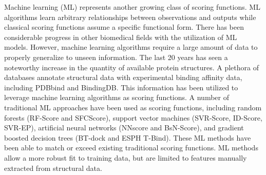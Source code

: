 \documentclass[linenumbers,doublespacing]{bmcart}
\begin{document}
Machine learning (ML) represents another growing class of scoring functions\cite{liu2015classification}. ML algorithms learn arbitrary relationships between observations and outputs while classical scoring functions assume a specific functional form\cite{ain2015machine}. There has been considerable progress in other biomedical fields with the utilization of ML models\cite{zitnik2019machine}. However, machine learning algorithms require a large amount of data to properly generalize to unseen information. The last 20 years has seen a noteworthy increase in the quantity of available protein structures\cite{berman2000protein}. A plethora of databases annotate structural data with experimental binding affinity data, including PDBbind and BindingDB\cite{wang2004pdbbind,liu2017forging,gilson2016bindingdb}. This information has been utilized to leverage machine learning algorithms as scoring functions. A number of traditional ML approaches have been used as scoring functions, including random forests (RF-Score\cite{ballester2010machine} and SFCScore\cite{zilian2013sfcscore}), support vector machines (SVR-Score\cite{ballester2012machine}, ID-Score\cite{li2013idscore}, SVR-EP\cite{li2011svr}), artificial neural networks (NNscore\cite{durrant2010nnscore} and BsN-Score\cite{ashtawy2015bsn}), and gradient boosted decision trees (BT-dock\cite{btdock} and ESPH T-Bind\cite{cang2018integration}). These ML methods have been able to match or exceed existing traditional scoring functions. ML methods allow a more robust fit to training data, but are limited to features manually extracted from structural data.
\end{document}
